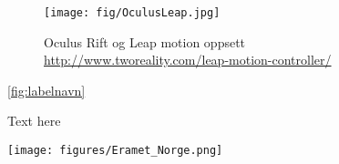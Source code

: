 \begin{figure}[htbp]
	\centering
	    \texttt{[image: fig/OculusLeap.jpg]}
	    \caption{Oculus Rift og Leap motion oppsett \\\url{http://www.tworeality.com/leap-motion-controller/}}
	\label{fig:OculusLeap}
\end{figure}

\ref{fig:labelnavn}



\begin{minipage}[c]{0.6\textwidth}
Text here
\end{minipage}
\begin{minipage}[c]{0.8\textwidth}
\texttt{[image: figures/Eramet\_Norge.png]}
\caption{Eramet's factory locations in Norway in Sauda, Porsgrunn and Kvinesdal. \\\url{https://goo.gl/maps/H825EGMMJ722}}
\label{fig:Er_Nor}
\end{minipage}